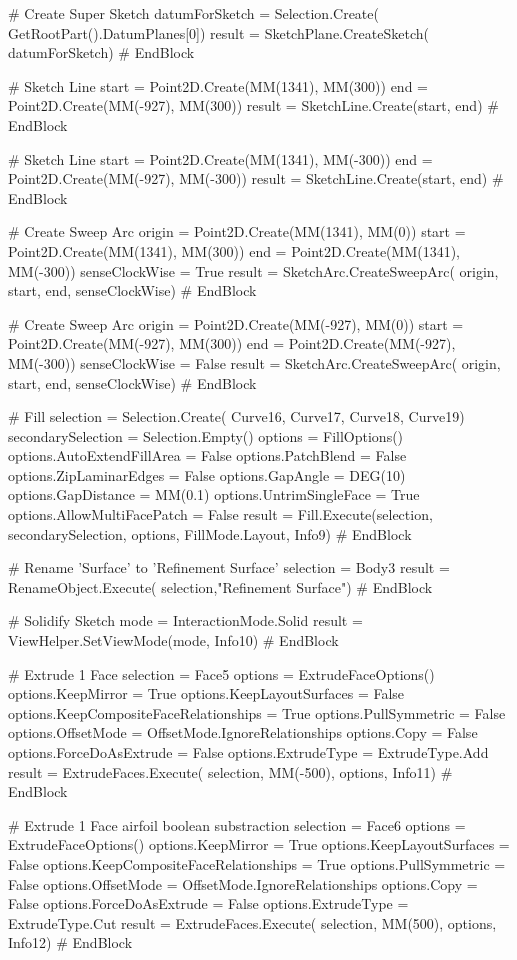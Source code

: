 # Create Super Sketch
datumForSketch = Selection.Create(
    GetRootPart().DatumPlanes[0])
result = SketchPlane.CreateSketch(
    datumForSketch)
# EndBlock


# Sketch Line
start = Point2D.Create(MM(1341), MM(300))
end = Point2D.Create(MM(-927), MM(300))
result = SketchLine.Create(start, end)
# EndBlock


# Sketch Line
start = Point2D.Create(MM(1341), MM(-300))
end = Point2D.Create(MM(-927), MM(-300))
result = SketchLine.Create(start, end)
# EndBlock


# Create Sweep Arc
origin = Point2D.Create(MM(1341), MM(0))
start = Point2D.Create(MM(1341), MM(300))
end = Point2D.Create(MM(1341), MM(-300))
senseClockWise = True
result = SketchArc.CreateSweepArc(
    origin, start, end, 
    senseClockWise)
# EndBlock


# Create Sweep Arc
origin = Point2D.Create(MM(-927), MM(0))
start = Point2D.Create(MM(-927), MM(300))
end = Point2D.Create(MM(-927), MM(-300))
senseClockWise = False
result = SketchArc.CreateSweepArc(
    origin, start, end, senseClockWise)
# EndBlock



# Fill
selection = Selection.Create(
    Curve16, Curve17, Curve18, Curve19)
secondarySelection = Selection.Empty()
options = FillOptions()
options.AutoExtendFillArea = False
options.PatchBlend = False
options.ZipLaminarEdges = False
options.GapAngle = DEG(10)
options.GapDistance = MM(0.1)
options.UntrimSingleFace = True
options.AllowMultiFacePatch = False
result = Fill.Execute(selection, 
                      secondarySelection, 
                      options, FillMode.Layout, Info9)
# EndBlock

# Rename 'Surface' to 'Refinement Surface'
selection = Body3
result = RenameObject.Execute(
    selection,"Refinement Surface")
# EndBlock


# Solidify Sketch
mode = InteractionMode.Solid
result = ViewHelper.SetViewMode(mode, Info10)
# EndBlock

# Extrude 1 Face
selection = Face5
options = ExtrudeFaceOptions()
options.KeepMirror = True
options.KeepLayoutSurfaces = False
options.KeepCompositeFaceRelationships = True
options.PullSymmetric = False
options.OffsetMode = OffsetMode.IgnoreRelationships
options.Copy = False
options.ForceDoAsExtrude = False
options.ExtrudeType = ExtrudeType.Add
result = ExtrudeFaces.Execute(
    selection, MM(-500), options, Info11)
# EndBlock

# Extrude 1 Face airfoil boolean substraction
selection = Face6
options = ExtrudeFaceOptions()
options.KeepMirror = True
options.KeepLayoutSurfaces = False
options.KeepCompositeFaceRelationships = True
options.PullSymmetric = False
options.OffsetMode = OffsetMode.IgnoreRelationships
options.Copy = False
options.ForceDoAsExtrude = False
options.ExtrudeType = ExtrudeType.Cut
result = ExtrudeFaces.Execute(
    selection, MM(500), options, Info12)
# EndBlock


